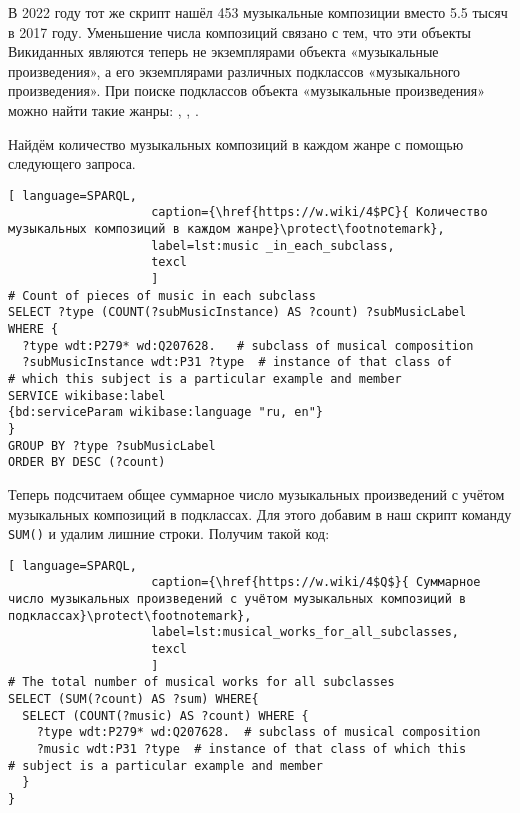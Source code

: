 В 2022 году тот же скрипт нашёл \num{453} музыкальные композиции вместо \num{5,5} тысяч в 2017 году. Уменьшение числа композиций связано с тем, что эти объекты Викиданных являются теперь не экземплярами объекта «музыкальные произведения», а его экземплярами различных подклассов «музыкального произведения». При поиске подклассов объекта «музыкальные произведения» можно найти такие жанры: , , .

Найдём количество музыкальных композиций в каждом жанре с помощью следующего запроса.

\begin{lstlisting}[ language=SPARQL,
                    caption={\href{https://w.wiki/4$PC}{ Количество музыкальных композиций в каждом жанре}\protect\footnotemark},
                    label=lst:music _in_each_subclass,
                    texcl 
                    ]
# Count of pieces of music in each subclass
SELECT ?type (COUNT(?subMusicInstance) AS ?count) ?subMusicLabel 
WHERE {
  ?type wdt:P279* wd:Q207628.	# subclass of musical composition
  ?subMusicInstance wdt:P31 ?type  # instance of that class of
# which this subject is a particular example and member
SERVICE wikibase:label 
{bd:serviceParam wikibase:language "ru, en"}
}
GROUP BY ?type ?subMusicLabel
ORDER BY DESC (?count)
\end{lstlisting}%

Теперь подсчитаем общее суммарное число музыкальных произведений с учётом музыкальных композиций в подклассах. Для этого добавим в наш скрипт команду \lstinline|SUM()| и удалим лишние строки. Получим такой код:

\begin{lstlisting}[ language=SPARQL,
                    caption={\href{https://w.wiki/4$Q$}{ Суммарное число музыкальных произведений с учётом музыкальных композиций в подклассах}\protect\footnotemark},
                    label=lst:musical_works_for_all_subclasses,
                    texcl 
                    ]
# The total number of musical works for all subclasses 
SELECT (SUM(?count) AS ?sum) WHERE{
  SELECT (COUNT(?music) AS ?count) WHERE {
    ?type wdt:P279* wd:Q207628.  # subclass of musical composition
    ?music wdt:P31 ?type  # instance of that class of which this
# subject is a particular example and member
  }
}
\end{lstlisting}%

